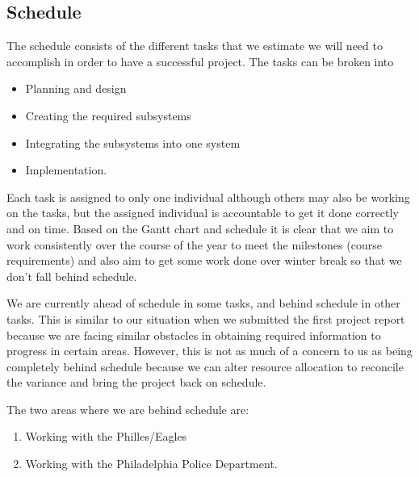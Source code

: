 \documentclass[12pt]{article}
\begin{document}
\addtocounter{subsection}{1} %

\subsection{Schedule}
The schedule consists of the different tasks that we estimate we will
need to accomplish in order to have a successful project. The tasks
can be broken into

\begin{itemize}
  \item Planning and design
  \item Creating the required subsystems
  \item Integrating the subsystems into one system
  \item Implementation.
\end{itemize}

Each task is assigned to only one individual although others may also
be working on the tasks, but the assigned individual is accountable to
get it done correctly and on time. Based on the Gantt chart and
schedule it is clear that we aim to work consistently over the course
of the year to meet the milestones (course requirements) and also aim
to get some work done over winter break so that we don’t fall behind
schedule.

We are currently ahead of schedule in some tasks, and behind schedule
in other tasks. This is similar to our situation when we submitted the
first project report because we are facing similar obstacles in
obtaining required information to progress in certain areas. However,
this is not as much of a concern to us as being completely behind
schedule because we can alter resource allocation to reconcile the
variance and bring the project back on schedule.

The two areas where we are behind schedule are:

\begin{enumerate}[label=(\emph{\alph*})]
  \item Working with the Philles/Eagles
  \item Working with the Philadelphia Police Department.
\end{enumerate}
\end{document}
